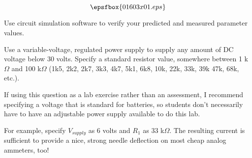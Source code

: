

$$\epsfbox{01603x01.eps}$$

\vfil \eject






Use circuit simulation software to verify your predicted and measured parameter values.







Use a variable-voltage, regulated power supply to supply any amount of DC voltage below 30 volts.  Specify a standard resistor value, somewhere between 1 k$\Omega$ and 100 k$\Omega$ (1k5, 2k2, 2k7, 3k3, 4k7, 5k1, 6k8, 10k, 22k, 33k, 39k 47k, 68k, etc.).

If using this question as a lab exercise rather than an assessment, I recommend specifying a voltage that is standard for batteries, so students don't necessarily have to have an adjustable power supply available to do this lab.

For example, specify $V_{supply}$ as 6 volts and $R_1$ as 33 k$\Omega$.  The resulting current is sufficient to provide a nice, strong needle deflection on most cheap analog ammeters, too!




